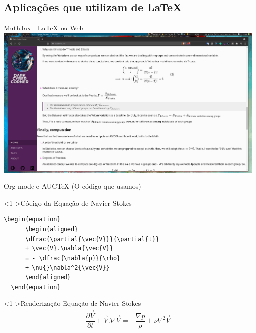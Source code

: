 \documentclass[bigger]{beamer}
\begin{document}
{\subsection{Aplicações que utilizam de \LaTeX{}}
\label{sec:org2a6a943}
\begin{frame}[label={sec:org2abb943}]{MathJax - \LaTeX{} na Web}
\transdissolve
\href{img/mathjax.png}{\includegraphics[center,width=1.02\textwidth]{./img/mathjax.png}}
\end{frame}

\begin{frame}[label={sec:org6c6003a},fragile]{Org-mode e AUCTeX (O código que usamos)}
 \begin{block}<1->{Código da Equação de Navier-Stokes}
\begin{verbatim}
\begin{equation}
	  \begin{aligned}
	  \dfrac{\partial{\vec{V}}}{\partial{t}}
	  + \vec{V}.\nabla{\vec{V}}
	  = - \dfrac{\nabla{p}}{\rho}
	  + \nu{}\nabla^2{\vec{V}}
	  \end{aligned}
  \end{equation}
\end{verbatim}

\transdissolve
\pause
\end{block}

\begin{block}<1->{Renderização Equação de Navier-Stokes}
\begin{equation}
        \begin{aligned}
        \dfrac{\partial{\vec{V}}}{\partial{t}} + \vec{V}.\nabla{\vec{V}} = - \dfrac{\nabla{p}}{\rho} + \nu{}\nabla^2{\vec{V}}
        \end{aligned}
\end{equation}
\end{block}
\end{frame}

}
\end{document}
